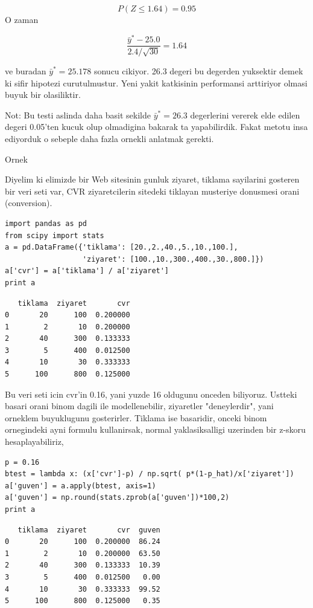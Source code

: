 \documentclass[12pt,fleqn]{article}\usepackage{../common}
\begin{document}
$$ P(Z \le 1.64)  = 0.95 $$
O zaman 

$$ \frac{\bar{y}^* - 25.0}{2.4 / \sqrt{30}} = 1.64 $$

ve buradan $\bar{y}^* = 25.178$ sonucu cikiyor. 26.3 degeri bu degerden
yuksektir demek ki sifir hipotezi curutulmustur. Yeni yakit katkisinin
performansi arttiriyor olmasi buyuk bir olasiliktir. 

Not: Bu testi aslinda daha basit sekilde $\bar{y}^* = 26.3$ degerlerini
vererek elde edilen degeri 0.05'ten kucuk olup olmadigina bakarak ta
yapabilirdik. Fakat metotu insa ediyorduk o sebeple daha fazla ornekli
anlatmak gerekti. 

Ornek

Diyelim ki elimizde bir Web sitesinin gunluk ziyaret, tiklama sayilarini
gosteren bir veri seti var, CVR ziyaretcilerin sitedeki tiklayan musteriye
donusmesi orani (conversion). 

\begin{verbatim}
import pandas as pd
from scipy import stats
a = pd.DataFrame({'tiklama': [20.,2.,40.,5.,10.,100.],
                  'ziyaret': [100.,10.,300.,400.,30.,800.]})
a['cvr'] = a['tiklama'] / a['ziyaret'] 
print a
\end{verbatim}

\begin{verbatim}
   tiklama  ziyaret       cvr
0       20      100  0.200000
1        2       10  0.200000
2       40      300  0.133333
3        5      400  0.012500
4       10       30  0.333333
5      100      800  0.125000
\end{verbatim}

Bu veri seti icin cvr'in 0.16, yani yuzde 16 oldugunu onceden
biliyoruz. Ustteki basari orani binom dagili ile modellenebilir, ziyaretler
"deneylerdir", yani orneklem buyuklugunu gosterirler. Tiklama ise
basaridir, onceki binom ornegindeki ayni formulu kullanirsak, normal
yaklasiksalligi uzerinden bir z-skoru hesaplayabiliriz,

\begin{verbatim}
p = 0.16
btest = lambda x: (x['cvr']-p) / np.sqrt( p*(1-p_hat)/x['ziyaret'])
a['guven'] = a.apply(btest, axis=1)
a['guven'] = np.round(stats.zprob(a['guven'])*100,2)
print a
\end{verbatim}

\begin{verbatim}
   tiklama  ziyaret       cvr  guven
0       20      100  0.200000  86.24
1        2       10  0.200000  63.50
2       40      300  0.133333  10.39
3        5      400  0.012500   0.00
4       10       30  0.333333  99.52
5      100      800  0.125000   0.35
\end{verbatim}
\end{document}
